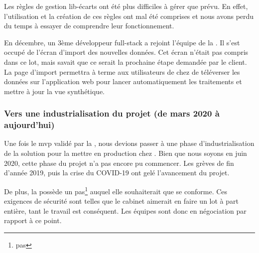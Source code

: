 
Les règles de gestion lib-écarts ont été plus difficiles à gérer que prévu. En effet, l'utilisation et la création de ces règles ont mal été comprises et nous avons perdu du temps à essayer de comprendre leur fonctionnement.

En décembre, un 3ème développeur \gls{full-stack} a rejoint l'équipe de la \df. Il s'est occupé de l'écran d'import des nouvelles données. Cet écran n'était pas compris dans ce lot, mais \damien savait que ce serait la prochaine étape demandée par le client. La page d'import permettra à terme aux utilisateurs de chez \sncf de téléverser les données sur l'application web pour lancer automatiquement les traitements et mettre à jour la vue synthétique.

\newpage
\subsubsection{Vers une industrialisation du projet (de mars 2020 à aujourd'hui)}


Une fois le \gls{mvp} validé par la \sncf, nous devions passer à une phase d'industrialisation de la solution pour la mettre en production chez \sncf.
Bien que nous soyons en juin 2020, cette phase du projet n'a pas encore pu commencer. Les grèves de fin d'année 2019, puis la crise du \textsc{COVID-19} ont gelé l'avancement du projet.

De plus, la \sncf possède un \gls{pas}\footnote{\glsdesc{pas}} auquel elle souhaiterait que \tnp se conforme. Ces exigences de sécurité sont telles que le cabinet aimerait en faire un lot à part entière, tant le travail est conséquent. Les équipes sont donc en négociation par rapport à ce point.
